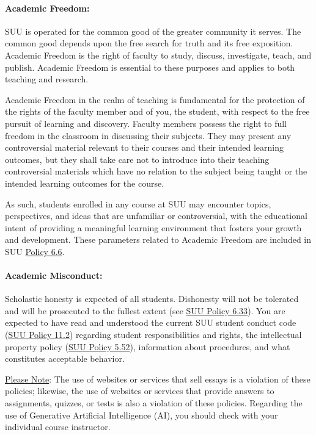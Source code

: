 \documentclass[12pt, letterpaper]{article}
\begin{document}
\paragraph{Academic Freedom:}
SUU is operated for the common good of the greater community it serves. The common good depends upon the free search for truth and its free exposition. Academic Freedom is the right of faculty to study, discuss, investigate, teach, and publish. Academic Freedom is essential to these purposes and applies to both teaching and research.

\noindent
Academic Freedom in the realm of teaching is fundamental for the protection of the rights of the faculty member and of you, the student, with respect to the free pursuit of learning and discovery. Faculty members possess the right to full freedom in the classroom in discussing their subjects. They may present any controversial material relevant to their courses and their intended learning outcomes, but they shall take care not to introduce into their teaching controversial materials which have no relation to the subject being taught or the intended learning outcomes for the course.

\noindent
As such, students enrolled in any course at SUU may encounter topics, perspectives, and ideas that are unfamiliar or controversial, with the educational intent of providing a meaningful learning environment that fosters your growth and development. These parameters related to Academic Freedom are included in SUU \href{https://www.suu.edu/policies/06/06.html}{Policy 6.6}.

\paragraph{Academic Misconduct:}
Scholastic honesty is expected of all students. Dishonesty will not be tolerated and will be prosecuted to the fullest extent (see \href{https://www.suu.edu/policies/06/33.html}{SUU Policy 6.33}). You are expected to have read and understood the current SUU student conduct code (\href{https://www.suu.edu/policies/11/02.html}{SUU Policy 11.2}) regarding student responsibilities and rights, the intellectual property policy (\href{https://www.suu.edu/policies/05/52.html}{SUU Policy 5.52}), information about procedures, and what constitutes acceptable behavior.

\noindent
\underline{Please Note}: The use of websites or services that sell essays is a violation of these policies; likewise, the use of websites or services that provide answers to assignments, quizzes, or tests is also a violation of these policies. Regarding the use of Generative Artificial Intelligence (AI), you should check with your individual course instructor.
\end{document}
